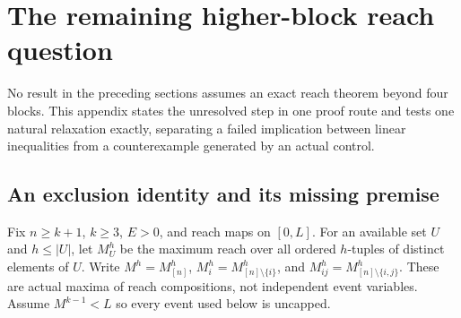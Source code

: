 \section{The remaining higher-block reach question}\label{sec:higher-reach}

No result in the preceding sections assumes an exact reach theorem beyond
four blocks. This appendix states the unresolved step in one proof route
and tests one natural relaxation exactly, separating a failed implication
between linear inequalities from a counterexample generated by an actual
control.

\subsection{An exclusion identity and its missing premise}

Fix $n\ge k+1$, $k\ge3$, $E>0$, and reach maps on $[0,L]$.
For an available set $U$ and $h\le |U|$, let $M_U^h$ be the maximum
reach over all ordered $h$-tuples of distinct elements of $U$.
Write $M^h=M_{[n]}^h$, $M_i^h=M_{[n]\setminus\{i\}}^h$, and
$M_{ij}^h=M_{[n]\setminus\{i,j\}}^h$. These are actual maxima of
reach compositions, not independent event variables. Assume
$M^{k-1}<L$ so every event used below is uncapped.


